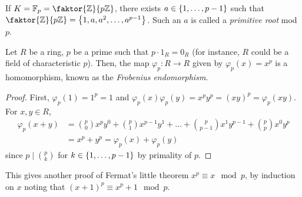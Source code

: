 \begin{remark}
	If \( K = \mathbb F_p = \faktor{\mathbb Z}{p\mathbb Z} \), there exists \( a \in \qty{1, \dots, p-1} \) such that \( \faktor{\mathbb Z}{p\mathbb Z} = \qty{1, a, a^2, \dots, a^{p-1}} \).
	Such an \( a \) is called a \emph{primitive root} mod \( p \).
\end{remark}
\begin{proposition}
	Let \( R \) be a ring, \( p \) be a prime such that \( p \cdot 1_R = 0_R \) (for instance, \( R \) could be a field of characteristic \( p \)).
	Then, the map \( \varphi_p \colon R \to R \) given by \( \varphi_p(x) = x^p \) is a homomorphism, known as the \emph{Frobenius endomorphism}.
\end{proposition}
\begin{proof}
	First, \( \varphi_p(1) = 1^p = 1 \) and \( \varphi_p(x)\varphi_p(y) = x^p y^p = (xy)^p = \varphi_p(xy) \).
	For \( x,y \in R \),
	\begin{align*}
		\varphi_p(x + y) &= \binom p 0 x^p y^0 + \binom p 1 x^{p-1} y^1 + \dots + \binom p {p-1} x^1 y^{p-1} + \binom p p x^0 y^p \\
		&= x^p + y^p = \varphi_p(x) + \varphi_p(y)
	\end{align*}
	since \( p \mid \binom p k \) for \( k \in \qty{1, \dots, p-1} \) by primality of \( p \).
\end{proof}
\begin{example}
	This gives another proof of Fermat's little theorem \( x^p \equiv x \mod p \), by induction on \( x \) noting that \( (x+1)^p \equiv x^p + 1 \mod p \).
\end{example}
